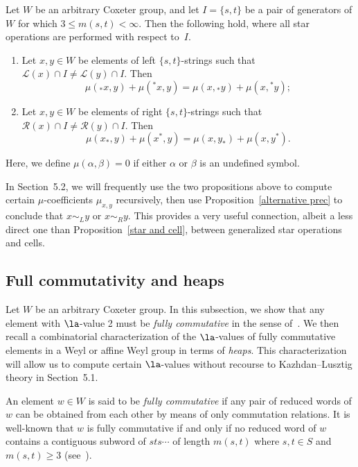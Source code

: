  \begin{prop}
 \label{star relation}
 Let $W$ be an arbitrary Coxeter group, and let $I=\{s,t\}$ be a pair of
 generators of $W$ for which $3\le m(s,t)<\infty$. Then the following
 hold,
 where all star operations are performed with respect to~$I$.

 \begin{enumerate}
 \item\label{prop3.7_1} 
 Let $x,y\in W$ be
 elements of left $\{s,t\}$-strings such that $\mathcal{L}(x)\cap I\neq
 \mathcal{L}(y)\cap I$. Then
 \[
 \mu({}_* x,y)+\mu({}^* x,y)=\mu(x,{}_* y)+\mu(x, {}^* y);
 \]

 \item\label{prop3.7_2} 
 Let $x,y\in W$ be
 elements of right $\{s,t\}$-strings such that $\mathcal{R}(x)\cap I\neq
 \mathcal{R}(y)\cap I$. Then
 \[
 \mu(x_*,y)+\mu(x^*,y)=\mu(x,y_*)+\mu(x, y^*).
 \]
 \end{enumerate}
 Here, we define $\mu(\alpha,\beta)=0$ if either $\alpha$ or $\beta$ is an undefined symbol.
 \end{prop}


 In Section~5.2, we will frequently use the two propositions above to
 compute certain $\mu$-coefficients $\mu_{x,y}$ recursively, then use Proposition~\ref{alternative prec} to conclude that $x\sim_{L}y$ or $x\sim_R y$. This provides
 a very useful connection, albeit a less direct one than Proposition~\ref{star
 and cell}, between generalized star operations and cells. 

 \subsection{Full commutativity and heaps} 
 \label{fc}
 Let $W$ be an arbitrary Coxeter group. In this subsection,
 we show that any element with $\la$-value 2 must be
 \emph{fully commutative} in the sense of~\cite{FC}. We then recall a
 combinatorial characterization of the $\la$-values of fully commutative
 elements in a Weyl or affine Weyl group in terms of \emph{heaps}. This
 characterization will allow us to compute certain $\la$-values without
 recourse to Kazhdan--Lusztig theory in Section~5.1.

 An element $w\in W$ is said to be \emph{fully commutative} if any pair of
 reduced words of $w$ can be obtained from each other by means of only
 commutation relations. It is well-known that $w$ is fully commutative if
 and only if no reduced word of $w$ contains a
 contiguous subword of $sts\cdots$ of length $m(s,t)$ where $s,t\in S$
 and $m(s,t)\ge 3$ (see~\cite[Proposition~2.1]{FC}).

